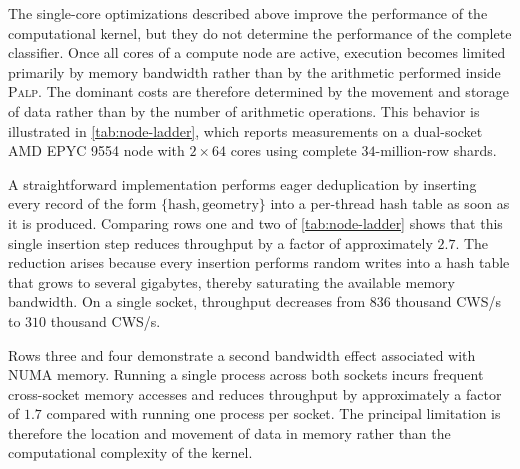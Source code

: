 \documentclass[appliedmath,article,submit,moreauthors]{Definitions/mdpi}
\newcommand{\PALP}{\textsc{Palp}}
\begin{document}
The single-core optimizations described above improve the performance of the
computational kernel, but they do not determine the performance of the complete
classifier. Once all cores of a compute node are active, execution becomes
limited primarily by memory bandwidth rather than by the arithmetic performed
inside \PALP. The dominant costs are therefore determined by the movement and
storage of data rather than by the number of arithmetic operations. This
behavior is illustrated in \cref{tab:node-ladder}, which reports measurements on
a dual-socket AMD EPYC 9554 node with \(2\times64\) cores using complete
\(34\)-million-row shards.

A straightforward implementation performs eager deduplication by inserting every
record of the form \(\{\mathrm{hash},\mathrm{geometry}\}\) into a per-thread
hash table as soon as it is produced. Comparing rows one and two of
\cref{tab:node-ladder} shows that this single insertion step reduces throughput
by a factor of approximately \(2.7\). The reduction arises because every
insertion performs random writes into a hash table that grows to several
gigabytes, thereby saturating the available memory bandwidth. On a single
socket, throughput decreases from \(836\) thousand CWS/s to \(310\) thousand
CWS/s.

Rows three and four demonstrate a second bandwidth effect associated with NUMA
memory. Running a single process across both sockets incurs frequent
cross-socket memory accesses and reduces throughput by approximately a factor of
\(1.7\) compared with running one process per socket. The principal limitation
is therefore the location and movement of data in memory rather than the
computational complexity of the kernel.
\end{document}
